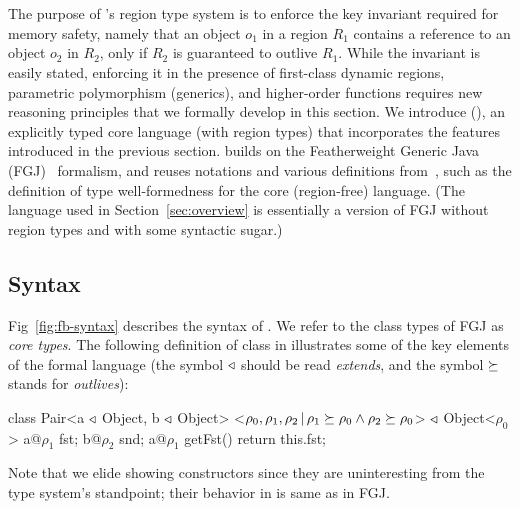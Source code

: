 \section{\fbname}
\label{sec:type-system}

The purpose of \name's region type system is to enforce the key
invariant required for memory safety, namely that an object $o_1$ in a
region $R_1$ contains a reference to an object $o_2$ in $R_2$, only if
$R_2$ is guaranteed to outlive $R_1$.  While the invariant is easily
stated, enforcing it in the presence of first-class dynamic regions,
parametric polymorphism (generics), and higher-order functions
requires new reasoning principles that we formally develop in this
section. We introduce \fbname (\FB), an explicitly typed core language
(with region types) that incorporates the features introduced in the
previous section. \fbname builds on the Featherweight Generic Java
(FGJ)~\cite{fgj} formalism, and reuses notations and various
definitions from~\cite{fgj}, such as the definition of type
well-formedness for the core (region-free) language.  (The language
used in Section~\ref{sec:overview} is essentially a version of FGJ
without region types and with some syntactic sugar.)

\subsection{Syntax}
\label{sec:fb-syntax}

Fig~\ref{fig:fb-syntax} describes the syntax of \FB.
We refer to the class types of FGJ as \emph{core types}.
%
The following definition of  class in \FB illustrates some of
the key elements of the formal language (the symbol $\triangleleft$ should
be read \emph{extends}, and the symbol $\succeq$ stands for
\emph{outlives}):
\begin{codejava}[mathescape=true]
class Pair<a $\triangleleft$ Object, b $\triangleleft$ Object>
          <$\rho_0, \rho_1, \rho_2 \,|\, \rho_1 \succeq \rho_0 \wedge
          \rho_2 \succeq \rho_0$> $\triangleleft$ Object<$\rho_0$> {
  a@$\rho_1$ fst; 
  b@$\rho_2$ snd;
  a@$\rho_1$ getFst() { return this.fst; }
}
\end{codejava}
Note that we elide showing constructors since they are uninteresting
from the type system's standpoint; their behavior in \FB is same as in
FGJ. 


